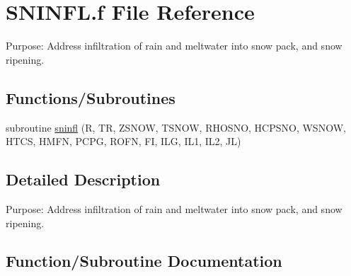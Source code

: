 \hypertarget{SNINFL_8f}{}\section{S\+N\+I\+N\+F\+L.\+f File Reference}
\label{SNINFL_8f}


Purpose\+: Address infiltration of rain and meltwater into snow pack, and snow ripening.  


\subsection*{Functions/\+Subroutines}
\begin{DoxyCompactItemize}
\item 
subroutine \hyperlink{SNINFL_8f_a40705488cafaec0ed712b2b926c1d67d}{sninfl} (R, T\+R, Z\+S\+N\+O\+W, T\+S\+N\+O\+W, R\+H\+O\+S\+N\+O, H\+C\+P\+S\+N\+O, W\+S\+N\+O\+W, H\+T\+C\+S, H\+M\+F\+N, P\+C\+P\+G, R\+O\+F\+N, F\+I, I\+L\+G, I\+L1, I\+L2, J\+L)
\end{DoxyCompactItemize}


\subsection{Detailed Description}
Purpose\+: Address infiltration of rain and meltwater into snow pack, and snow ripening. 



\subsection{Function/\+Subroutine Documentation}
\hypertarget{SNINFL_8f_a40705488cafaec0ed712b2b926c1d67d}{}
